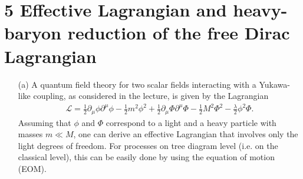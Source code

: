\documentclass[prd,%
,superscriptaddress,%
nofootinbib,%
tightenlines ]{revtex4}
\renewcommand{\L}{\mathcal{L}}
\renewcommand{\L}{\mathcal{L}}
\begin{document}
\section*{5 Effective Lagrangian and heavy-baryon reduction of the free Dirac Lagrangian}
\noindent
\begin{itemize}
	\item[(a)] A quantum field theory for two scalar fields interacting with a Yukawa-like coupling, as considered in the lecture, is given by the Lagrangian
\begin{gather}
\L=
\frac{1}{2}\partial_{\mu}\phi\partial^{\mu}\phi
-\frac{1}{2}m^2\phi^2
+\frac{1}{2}\partial_{\mu}\Phi\partial^{\mu}\Phi
-\frac{1}{2}M^2\Phi^2
-\frac{\lambda}{2}\phi^2\Phi.
\label{eq:Leff}
\end{gather}
Assuming that $\phi$ and $\Phi$ correspond to a light and a heavy particle with masses $m\ll M$, one can derive an effective Lagrangian that involves only the light degrees of freedom. For processes on tree diagram level (i.e. on the classical level), this can be easily done by using the equation of motion (EOM).


\end{itemize}
\end{document}
